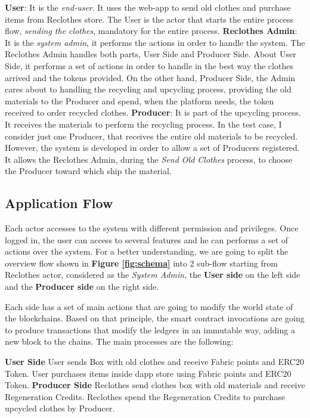 \begin{outline}
    \1 \textbf{User}: It is the \textit{end-user}. It uses the web-app to send old clothes and purchase items from Reclothes store.
    The User is the actor that starts the entire process flow, \textit{sending the clothes}, mandatory for the entire process. 
    \1 \textbf{Reclothes Admin}: It is the \textit{system admin}, it performs the actions in order to handle the system.
    The Reclothes Admin handles both parts, User Side and Producer Side. About User Side, it performs a set of actions
    in order to handle in the best way the clothes arrived and the tokens provided. On the other hand, Producer Side, the Admin
    cares about to handling the recycling and upcycling process, providing the old materials to the Producer
    and spend, when the platform needs, the token received to order recycled clothes.  
    \1 \textbf{Producer}: It is part of the upcycling process. It receives the materials to perform the recycling process.
    In the test case, I consider just one Producer, that receives the entire old materials to be recycled.
    However, the system is developed in order to allow a set of Producers registered. It allows the Reclothes Admin,
    during the \textit{Send Old Clothes} process, to choose the Producer toward which ship the material. 
\end{outline}

\subsection{Application Flow}

Each actor accesses to the system with different permission and privileges. Once logged in, 
the user can access to several features and he can performs a set of actions over the system. 
For a better understanding, we are going to split the overview flow shown in \textbf{Figure \ref{fig:schema}} 
into 2 sub-flow starting from Reclothes actor, considered as the \textit{System Admin}, 
the \textbf{User side} on the left side and the \textbf{Producer side} on the right side. 

\bigskip

Each side has a set of main actions that are going to modify the world state of the blockchains.
Based on that principle, the smart contract invocations are going to produce transactions that modify the 
ledgers in an immutable way, adding a new block to the chains. The main processes are the following: 

\begin{outline}[enumerate]
	\1 \textbf{User Side}
    \2 User sends Box with old clothes and receive Fabric points and ERC20 Token.
    \2 User purchases items inside dapp store using Fabric points and ERC20 Token.
    \1 \textbf{Producer Side}
    \2 Reclothes send clothes box with old materials and receive Regeneration Credits.
    \2 Reclothes spend the Regeneration Credits to purchase upcycled clothes by Producer.
\end{outline}

